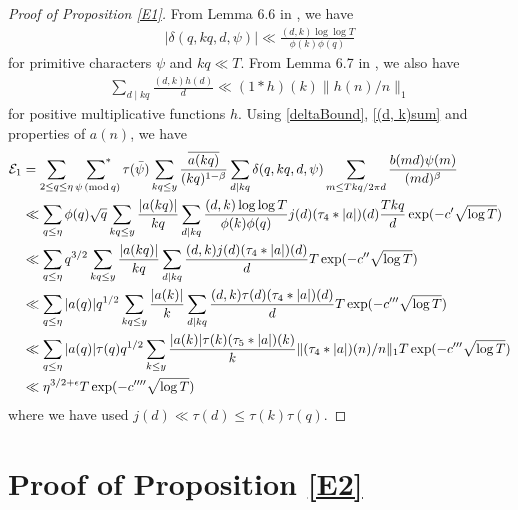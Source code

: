 \documentclass[oneside, 12pt]{amsart}
\theoremstyle{definition}
\renewcommand{\pmod}[1]{\,(\textup{mod}\,#1)}
\newcommand{\leqs}{\leqslant }
\begin{document}
\begin{proof}[Proof of Proposition \ref{E1}]
From Lemma 6.6 in \cite{Ngdiscrete}, we have 
\begin{align}\label{deltaBound}
|\delta(q, kq, d, \psi)|\ll \frac{(d, k)\log \log T}{\phi(k)\phi(q)}
\end{align}
for primitive characters $\psi$ and $kq\ll T$. 
From Lemma 6.7 in \cite{Ngdiscrete}, we also have 
\begin{align}\label{(d, k)sum}
\sum_{d\mid kq}\frac{(d,k)h(d)}{d}\ll (1*h)(k)\|h(n)/n\|_1
\end{align}
for positive multiplicative functions $h$. 
Using \eqref{deltaBound}, \eqref{(d, k)sum} and properties of $a(n)$, we have
\begin{align*}
\mathcal{E}_1&=\sum_{2\leq q\leq \eta} \sideset{}{^*}\sum_{\,\,\psi \pmod q} \tau(\bar{\psi}) \sum_{kq\leq y}\frac{\overline{a(kq)}}{(kq)^{1-\beta}} \sum_{d\mid kq}\delta(q, kq, d, \psi) \sum_{m\leq Tkq/2\pi d} \frac{b(md)\psi(m)}{(md)^\beta}\\
&\ll \sum_{q\leq \eta} \phi(q)\sqrt{q} \sum_{kq\leq y}\frac{|a(kq)|}{kq}\sum_{d\mid kq} \frac{(d, k)\log \log T}{\phi(k)\phi(q)} j(d)(\tau_4*|a|)(d)\frac{Tkq}{d} \exp(-c'\sqrt{\log T})\\
& \ll \sum_{q\leq \eta}q^{3/2}\sum_{kq\leq y}\frac{|a(kq)|}{kq} \sum_{d\mid kq}\frac{(d, k)j(d)(\tau_4* |a|)(d)}{d}T \exp (-c''\sqrt{\log T})\\
& \ll \sum_{q\leq \eta } |a(q)|q^{1/2} \sum_{kq\leq y}\frac{|a(k)|}{k}\sum_{d\mid kq} \frac{(d, k) \tau(d)(\tau_4* |a|)(d)}{d}T \exp(-c'''\sqrt{\log T}) \\
& \ll \sum_{q\leq \eta}|a(q)|\tau(q)q^{1/2}\sum_{k\leq y}\frac{|a(k)| \tau(k)(\tau_5*|a|)(k)}{k} \|(\tau_4*|a|)(n)/n\|_1T\exp(-c'''\sqrt{\log T})\\
& \ll \eta^{3/2+\epsilon} T \exp( -c''''\sqrt{\log T})
\end{align*}	
where we have used $j(d)\ll \tau(d)\leqs \tau(k)\tau(q)$.   
\end{proof}











\section{Proof of Proposition \ref{E2}}\label{LargemoduliPropProof}
\end{document}
